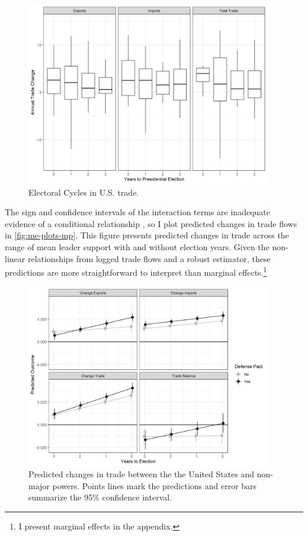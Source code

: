 \documentclass[12pt]{article}
\begin{document}
\begin{figure}
\centering
\includegraphics[width=0.95\textwidth]{../figures/us-trade-cycles.png}
\caption{Electoral Cycles in U.S. trade.}
\label{fig:us-trade-cycles}
\end{figure}



The sign and confidence intervals of the interaction terms are inadequate evidence of a conditional relationship \citep{BramborClarkGolder2006}, so I plot predicted changes in trade flows in \autoref{fig:me-plots-mp}.
This figure presents predicted changes in trade across the range of mean leader support with and without election years. 
Given the non-linear relationships from logged trade flows and a robust estimator, these predictions are more straightforward to interpret than marginal effects.\footnote{I present marginal effects in the appendix.} 


\begin{figure}[htpb]
	\centering
		\includegraphics[width=0.95\textwidth]{../figures/us-elec-pred.png}
	\caption{Predicted changes in trade between the the United States and non-major powers. Points lines mark the predictions and error bars summarize the 95\% confidence interval.}
	\label{fig:us-elec-pred}
\end{figure}
\end{document}
